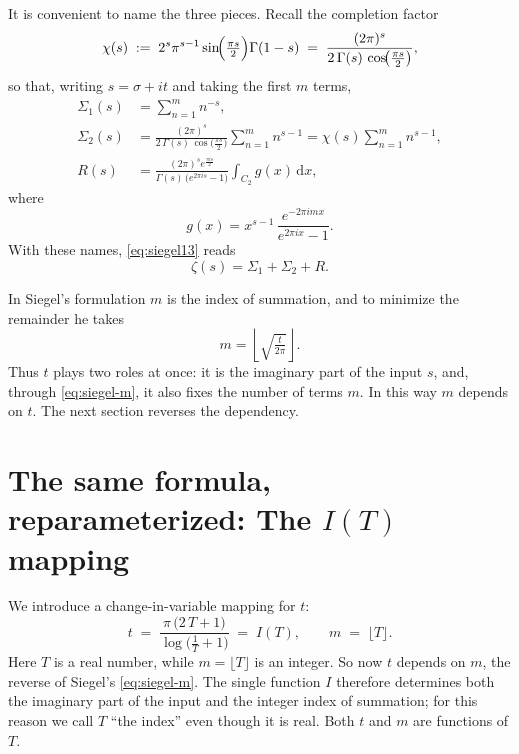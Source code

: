 \documentclass[11pt]{article}
\theoremstyle{definition}
\begin{document}
It is convenient to name the three pieces. Recall the completion factor
\begin{equation}
\chi(s) \;:=\; 2^{s}\pi^{s-1}\sin\!\Bigl(\tfrac{\pi s}{2}\Bigr)\Gamma(1-s)
\;=\;
\frac{(2\pi)^s}{2\,\Gamma(s)\,\cos\!\bigl(\tfrac{\pi s}{2}\bigr)},
\end{equation}
so that, writing $s=\sigma+it$ and taking the first $m$ terms,
\begin{align}
\Sigma_{1}(s) &= \sum_{n=1}^{m} n^{-s}, \\[2pt]
\Sigma_{2}(s) &= \frac{(2\pi)^s}{2\,\Gamma(s)\,\cos\!\bigl(\tfrac{\pi s}{2}\bigr)}
\sum_{n=1}^{m} n^{s-1}
= \chi(s)\sum_{n=1}^{m} n^{s-1}, \\[2pt]
R(s) &= \frac{(2\pi)^s e^{\tfrac{\pi i s}{2}}}{\Gamma(s)\,\bigl(e^{2\pi i s}-1\bigr)}
\int_{C_2} g(x)\,\mathrm{d}x,
\end{align}
where
\begin{equation}
g(x)=x^{s-1}\,\frac{e^{-2\pi i m x}}{e^{2\pi i x}-1}.
\end{equation}
With these names, \eqref{eq:siegel13} reads
\begin{equation}\label{eq:siegel-named}
\zeta(s) = \Sigma_{1} + \Sigma_{2} + R.
\end{equation}

In Siegel's formulation $m$ is the index of summation, and to minimize the
remainder he takes
\begin{equation}\label{eq:siegel-m}
m=\left\lfloor\sqrt{\tfrac{t}{2\pi}}\right\rfloor .
\end{equation}
Thus $t$ plays two roles at once: it is the imaginary part of the input $s$,
and, through \eqref{eq:siegel-m}, it also fixes the number of terms $m$. In
this way $m$ depends on $t$. The next section reverses the dependency.

\section{The same formula, reparameterized: The \texorpdfstring{$I(T)$}{I(T)} mapping}\label{sec:IT}

We introduce a change-in-variable mapping for $t$:
\begin{equation}\label{eq:IT}
t
\;=\;
\frac{\pi\,\bigl(2\,T + 1\bigr)}{\log\!\bigl(\tfrac{1}{T} + 1\bigr)}
\;=\; I(T),
\qquad
m \;=\; \lfloor T\rfloor .
\end{equation}
Here $T$ is a real number, while $m=\lfloor T\rfloor$ is an integer. So now
$t$ depends on $m$, the reverse of Siegel's \eqref{eq:siegel-m}. The single
function $I$ therefore determines both the imaginary part of the input and the
integer index of summation; for this reason we call $T$ ``the index'' even
though it is real. Both $t$ and $m$ are functions of $T$.
\end{document}
